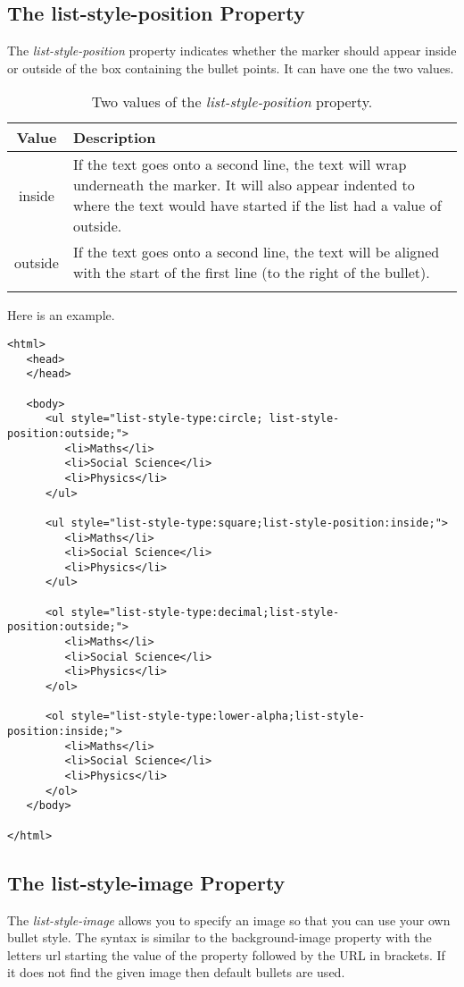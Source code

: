 \documentclass[a4paper,oneside]{book}
\numberwithin{equation}{chapter}
\begin{document}
\subsection{The list-style-position Property}
The \textit{list-style-position} property indicates whether the marker should appear inside or outside of the box containing the bullet points. It can have one the two values.
\begin{center}
\begin{longtable}{|c|p{10cm}|}
\hline
\textbf{Value} & \textbf{Description} \\
\hline
inside & If the text goes onto a second line, the text will wrap underneath the marker. It will also appear indented to where the text would have started if the list had a value of outside.\\
\hline
outside & If the text goes onto a second line, the text will be aligned with the start of the first line (to the right of the bullet).\\
\hline
\caption{Two values of the \textit{list-style-position} property.}
\end{longtable}
\end{center}
Here is an example.
\begin{verbatim}
<html>
   <head>
   </head>
   
   <body>
      <ul style="list-style-type:circle; list-style-position:outside;">
         <li>Maths</li>
         <li>Social Science</li>
         <li>Physics</li>
      </ul>
      
      <ul style="list-style-type:square;list-style-position:inside;">
         <li>Maths</li>
         <li>Social Science</li>
         <li>Physics</li>
      </ul>
      
      <ol style="list-style-type:decimal;list-style-position:outside;">
         <li>Maths</li>
         <li>Social Science</li>
         <li>Physics</li>
      </ol>
      
      <ol style="list-style-type:lower-alpha;list-style-position:inside;">
         <li>Maths</li>
         <li>Social Science</li>
         <li>Physics</li>
      </ol>
   </body>
   
</html>
\end{verbatim}
\subsection{The list-style-image Property}
The \textit{list-style-image} allows you to specify an image so that you can use your own bullet style. The syntax is similar to the background-image property with the letters url starting the value of the property followed by the URL in brackets. If it does not find the given image then default bullets are used.
\end{document}
